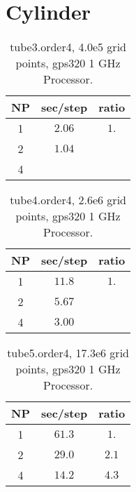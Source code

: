 \documentclass[12pt]{article}
\begin{document}
\clearpage
\section{Cylinder}

\begin{table}[hbt]
\begin{center}\footnotesize
\begin{tabular}{|c|c|c|} \hline 
     NP       & sec/step   & ratio \\   \hline\hline 
     1        &  $2.06$    & $ 1. $   \\ 
     2        &  $1.04$    & $    $   \\ 
     4        &  $    $    & $    $   \\ \hline 
\end{tabular}		
\end{center}		
\caption{tube3.order4, 4.0e5 grid points, gps320 1 GHz Processor.}
 \label{tab:box} 
\end{table}

\begin{table}[hbt]
\begin{center}\footnotesize
\begin{tabular}{|c|c|c|} \hline 
     NP       & sec/step   & ratio \\   \hline\hline 
     1        &  $11.8$    & $ 1. $   \\ 
     2        &  $5.67$    & $    $   \\ 
     4        &  $3.00$    & $    $   \\ \hline 
\end{tabular}		
\end{center}		
\caption{tube4.order4, 2.6e6 grid points, gps320 1 GHz Processor.}
 \label{tab:box} 
\end{table}

\begin{table}[hbt]
\begin{center}\footnotesize
\begin{tabular}{|c|c|c|} \hline 
     NP       & sec/step   & ratio \\   \hline\hline 
     1        &  $61.3$    & $ 1. $   \\ 
     2        &  $29.0$    & $ 2.1 $   \\ 
     4        &  $14.2$    & $ 4.3 $   \\ \hline 
\end{tabular}		
\end{center}		
\caption{tube5.order4, 17.3e6 grid points, gps320 1 GHz Processor.}
 \label{tab:box} 
\end{table}
\end{document}
